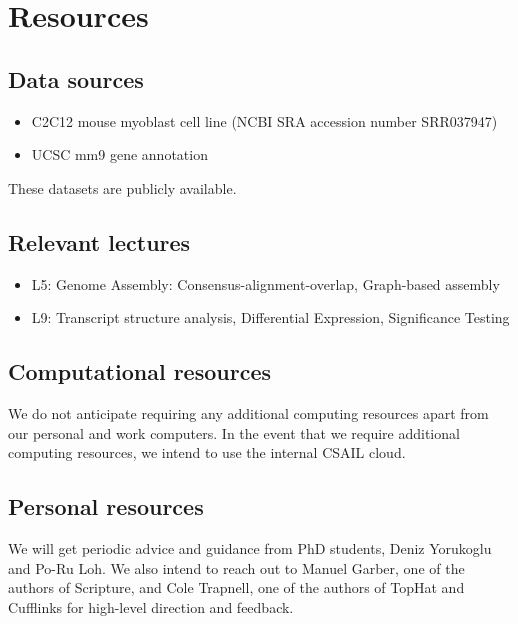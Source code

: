 \documentclass[12pt]{article}
\begin{document}
\section*{Resources}
\subsection*{Data sources}
\begin{itemize}
\item C2C12 mouse myoblast cell line (NCBI SRA accession number SRR037947) \citep{trapnell2010transcript}
\item UCSC mm9 gene annotation \citep{karolchik2008ucsc}
\end{itemize}
These datasets are publicly available.
\subsection*{Relevant lectures}
\begin{itemize}
\item L5: Genome Assembly: Consensus-alignment-overlap, Graph-based assembly
\item L9: Transcript structure analysis, Differential Expression, Significance Testing
\end{itemize}
\subsection*{Computational resources}
We do not anticipate requiring any additional computing resources apart from our personal and work computers. In the event that we require additional computing resources, we intend to use the internal CSAIL cloud.
\subsection*{Personal resources}
We will get periodic advice and guidance from PhD students, Deniz Yorukoglu and Po-Ru Loh. We also intend to reach out to Manuel Garber, one of the authors of Scripture, and Cole Trapnell, one of the authors of TopHat and Cufflinks for high-level direction and feedback.
\newpage


\end{document}
